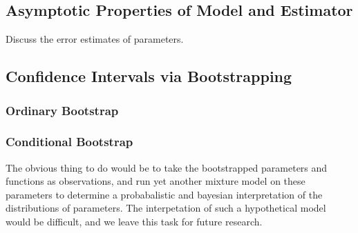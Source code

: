 \documentclass[fleqn,10pt]{olplainarticle}\usepackage[]{graphicx}\usepackage[]{color}
\DeclareMathOperator*{\argmin}{argmin}
\begin{document}

\subsection{Asymptotic Properties of Model and Estimator}

Discuss the error estimates of parameters.


\subsection{Confidence Intervals via Bootstrapping}

\subsubsection{Ordinary Bootstrap}

\subsubsection{Conditional Bootstrap}


The obvious thing to do would be to take the bootstrapped parameters and functions as observations, and run yet another mixture model on these parameters to determine a probabalistic and bayesian interpretation of the distributions of parameters. The interpetation of such a hypothetical model would be difficult, and we leave this task for future research.
\end{document}
